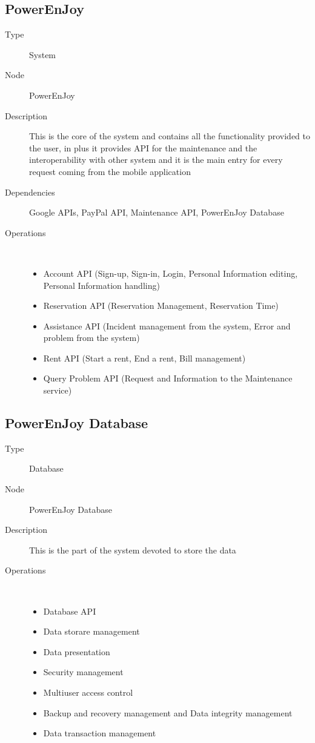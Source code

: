 \subsection{PowerEnJoy}
\begin{description}
	\item[Type] System
	\item[Node] PowerEnJoy
	\item[Description] This is the core of the system and contains all the functionality provided to the user, in plus it provides API for the maintenance and the interoperability with other system and it is the main entry for every request coming from the mobile application
	\item[Dependencies] Google APIs, PayPal API, Maintenance API, PowerEnJoy Database
	\item[Operations] \ \\
		\begin{itemize}
			\item Account API (Sign-up, Sign-in, Login, Personal Information editing, Personal Information handling)
			\item Reservation API (Reservation Management, Reservation Time)
			\item Assistance API (Incident management from the system, Error and problem from the system)
			\item Rent API (Start a rent, End a rent, Bill management)
			\item Query Problem API (Request and Information to the Maintenance service)
		\end{itemize}
\end{description}

\subsection{PowerEnJoy Database}
\begin{description}
	\item[Type] Database
	\item[Node] PowerEnJoy Database
	\item[Description] This is the part of the system devoted to store the data
	\item[Operations] \ \\
		\begin{itemize}
			\item Database API
			\item Data storare management
			\item Data presentation
			\item Security management
			\item Multiuser access control
			\item Backup and recovery management and Data integrity management
			\item Data transaction management
		\end{itemize}
\end{description}

